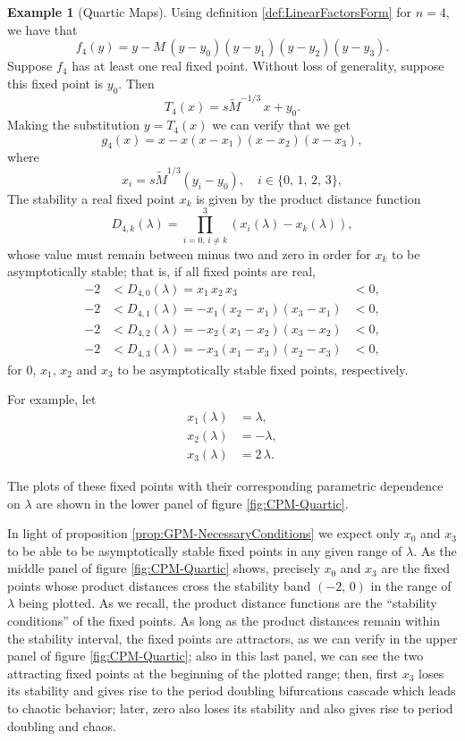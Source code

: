 \documentclass[10pt,twoside,titlepage]{book}
\numberwithin{equation}{chapter}
\numberwithin{figure}{chapter}
\numberwithin{table}{chapter}
\theoremstyle{plain}%
\theoremstyle{definition}
\newtheorem{example}{Example}[chapter]
\theoremstyle{remark}
\begin{document}
\begin{example}[Quartic Maps]
	
	Using definition \ref{def:LinearFactorsForm} for $n=4$, we have that
	\begin{equation}
		f_4(y)=y-M\,(y-y_0)(y-y_1)(y-y_2)(y-y_3).
	\end{equation}
	Suppose $f_4$ has at least one real fixed point. Without loss of generality, suppose this fixed point is $y_0$. Then
	\[T_4(x)=s\tilde{M}^{-1/3}\,x+y_0.\]
	Making the substitution $y=T_4(x)$ we can verify that we get
	\[g_4(x)=x-x(x-x_1)(x-x_2)(x-x_3),\]
	where
	\[x_i=s\tilde{M}^{1/3}(y_i-y_0),\quad i\in\{0,\,1,\,2,\,3\},\]
	The stability a real fixed point $x_k$ is given by the product distance function
	\[D_{4,k}(\lambda)=\prod_{i=0,\,i\neq k}^3 (x_i(\lambda)-x_k(\lambda)),\]
	whose value must remain between minus two and zero in order for $x_k$ to be asymptotically stable; that is, if all fixed points are real,
	\begin{equation}
		\begin{aligned}
			-2 	&< D_{4,0}(\lambda)	= x_1\,x_2\,x_3 			&< 0,\\
			-2 	&< D_{4,1}(\lambda)	= -x_1(x_2-x_1)(x_3-x_1) 	&< 0,\\
			-2 	&< D_{4,2}(\lambda)	= -x_2(x_1-x_2)(x_3-x_2) 	&< 0,\\
			-2 	&< D_{4,3}(\lambda)	= -x_3(x_1-x_3)(x_2-x_3) 	&< 0,
		\end{aligned}
	\end{equation}
	for 0, $x_1,\,x_2$ and $x_3$ to be asymptotically stable fixed points, respectively.
	
	For example, let
	\begin{equation}
		\begin{aligned}
			x_1(\lambda) &= \lambda,\\
			x_2(\lambda) &= -\lambda,\\
			x_3(\lambda) &= 2\,\lambda.
		\end{aligned}
	\end{equation}
	
	The plots of these fixed points with their corresponding parametric dependence on $\lambda$ are shown in the lower panel of figure \ref{fig:CPM-Quartic}.
	
	In light of proposition \ref{prop:GPM-NecessaryConditions} we expect only $x_0$ and $x_3$ to be able to be asymptotically stable fixed points in any given range of $\lambda$. As the middle panel of figure \ref{fig:CPM-Quartic} shows, precisely $x_0$ and $x_3$ are the fixed points whose product distances cross the stability band $(-2,\,0)$ in the range of $\lambda$ being plotted. As we recall, the product distance functions are the ``stability conditions'' of the fixed points. As long as the product distances remain within the stability interval, the fixed points are attractors, as we can verify in the upper panel of figure \ref{fig:CPM-Quartic}; also in this last panel, we can see the two attracting fixed points at the beginning of the plotted range; then, first $x_3$ loses its stability and gives rise to the period doubling bifurcations cascade which leads to chaotic behavior; later, zero also loses its stability and also gives rise to period doubling and chaos.
	

\end{example}
\end{document}
